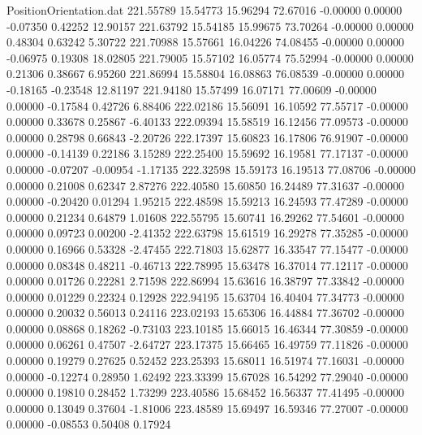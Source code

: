 \begin{filecontents}{PositionOrientation.dat}
 221.55789   15.54773   15.96294    72.67016   -0.00000    0.00000   -0.07350    0.42252   12.90157
 221.63792   15.54185   15.99675    73.70264   -0.00000    0.00000    0.48304    0.63242    5.30722
 221.70988   15.57661   16.04226    74.08455   -0.00000    0.00000   -0.06975    0.19308   18.02805
 221.79005   15.57102   16.05774    75.52994   -0.00000    0.00000    0.21306    0.38667    6.95260
 221.86994   15.58804   16.08863    76.08539   -0.00000    0.00000   -0.18165   -0.23548   12.81197
 221.94180   15.57499   16.07171    77.00609   -0.00000    0.00000   -0.17584    0.42726    6.88406
 222.02186   15.56091   16.10592    77.55717   -0.00000    0.00000    0.33678    0.25867   -6.40133
 222.09394   15.58519   16.12456    77.09573   -0.00000    0.00000    0.28798    0.66843   -2.20726
 222.17397   15.60823   16.17806    76.91907   -0.00000    0.00000   -0.14139    0.22186    3.15289
 222.25400   15.59692   16.19581    77.17137   -0.00000    0.00000   -0.07207   -0.00954   -1.17135
 222.32598   15.59173   16.19513    77.08706   -0.00000    0.00000    0.21008    0.62347    2.87276
 222.40580   15.60850   16.24489    77.31637   -0.00000    0.00000   -0.20420    0.01294    1.95215
 222.48598   15.59213   16.24593    77.47289   -0.00000    0.00000    0.21234    0.64879    1.01608
 222.55795   15.60741   16.29262    77.54601   -0.00000    0.00000    0.09723    0.00200   -2.41352
 222.63798   15.61519   16.29278    77.35285   -0.00000    0.00000    0.16966    0.53328   -2.47455
 222.71803   15.62877   16.33547    77.15477   -0.00000    0.00000    0.08348    0.48211   -0.46713
 222.78995   15.63478   16.37014    77.12117   -0.00000    0.00000    0.01726    0.22281    2.71598
 222.86994   15.63616   16.38797    77.33842   -0.00000    0.00000    0.01229    0.22324    0.12928
 222.94195   15.63704   16.40404    77.34773   -0.00000    0.00000    0.20032    0.56013    0.24116
 223.02193   15.65306   16.44884    77.36702   -0.00000    0.00000    0.08868    0.18262   -0.73103
 223.10185   15.66015   16.46344    77.30859   -0.00000    0.00000    0.06261    0.47507   -2.64727
 223.17375   15.66465   16.49759    77.11826   -0.00000    0.00000    0.19279    0.27625    0.52452
 223.25393   15.68011   16.51974    77.16031   -0.00000    0.00000   -0.12274    0.28950    1.62492
 223.33399   15.67028   16.54292    77.29040   -0.00000    0.00000    0.19810    0.28452    1.73299
 223.40586   15.68452   16.56337    77.41495   -0.00000    0.00000    0.13049    0.37604   -1.81006
 223.48589   15.69497   16.59346    77.27007   -0.00000    0.00000   -0.08553    0.50408    0.17924

\end{filecontents}
